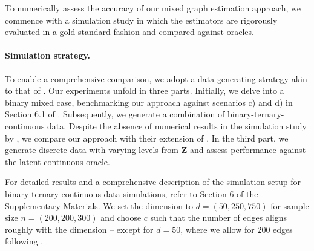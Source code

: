 To numerically assess the accuracy of our mixed graph estimation approach, we commence with a simulation study in which the estimators are rigorously evaluated in a gold-standard fashion and compared against oracles.
\paragraph{Simulation strategy.}
To enable a comprehensive comparison, we adopt a data-generating strategy akin to that of \cite{Fan17}. Our experiments unfold in three parts. Initially, we delve into a binary mixed case, benchmarking our approach against scenarios c) and d) in Section 6.1 of \cite{Fan17}. Subsequently, we generate a combination of binary-ternary-continuous data. Despite the absence of numerical results in the simulation study by \citet{Quan18}, we compare our approach with their extension of \citet{Fan17}. In the third part, we generate discrete data with varying levels from $\mathbf{Z}$ and assess performance against the latent continuous oracle.

For detailed results and a comprehensive description of the simulation setup for binary-ternary-continuous data simulations, refer to Section 6 of the Supplementary Materials. We set the dimension to $d = (50, 250, 750)$ for sample size $n = (200, 200, 300)$ and choose $c$ such that the number of edges aligns roughly with the dimension -- except for $d = 50$, where we allow for $200$ edges following \citet{Fan17}.


